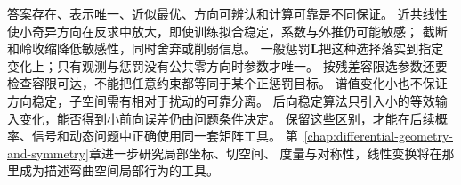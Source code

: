 答案存在、表示唯一、近似最优、方向可辨认和计算可靠是不同保证。
近共线性使小奇异方向在反求中放大，即使训练拟合稳定，系数与外推仍可能敏感；
截断和岭收缩降低敏感性，同时舍弃或削弱信息。
一般惩罚$\bm L$把这种选择落实到指定变化上；只有观测与惩罚没有公共零方向时参数才唯一。
按残差容限选参数还要检查容限可达，不能把任意约束都等同于某个正惩罚目标。
谱值变化小也不保证方向稳定，子空间需有相对于扰动的可靠分离。
后向稳定算法只引入小的等效输入变化，能否得到小前向误差仍由问题条件决定。
保留这些区别，才能在后续概率、信号和动态问题中正确使用同一套矩阵工具。
第~\ref{chap:differential-geometry-and-symmetry}章进一步研究局部坐标、切空间、
度量与对称性，线性变换将在那里成为描述弯曲空间局部行为的工具。
